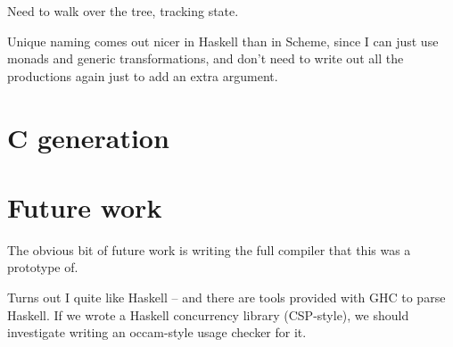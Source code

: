 \documentclass[a4paper,12pt]{article}
\def\occam{{\sffamily occam}\xspace}
\begin{document}
Need to walk over the tree, tracking state.

Unique naming comes out nicer in Haskell than in Scheme, since I can
just use monads and generic transformations, and don't need to write out
all the productions again just to add an extra argument.

\section{C generation}

\section{Future work}

The obvious bit of future work is writing the full compiler that this
was a prototype of.

Turns out I quite like Haskell -- and there are tools provided with GHC
to parse Haskell. If we wrote a Haskell concurrency library (CSP-style),
we should investigate writing an \occam-style usage checker for it.



\end{document}
